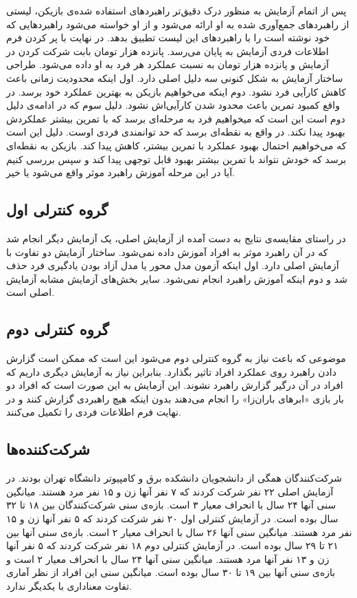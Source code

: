 \documentclass[twoside, a4paper,11pt]{book}
\numberwithin{equation}{chapter}
\numberwithin{table}{chapter}
\numberwithin{figure}{chapter}
\numberwithin{equation}{chapter}
\begin{document}
پس از اتمام آزمایش به منظور درک دقیق‌تر راهبردهای استفاده شده‌ی بازیکن، لیستی از راهبردهای جمع‌آوری شده به او ارائه می‌شود و از او خواسته می‌شود راهبردهایی که خود نوشته است را با راهبردهای این لیست تطبیق بدهد. در نهایت با پر کردن فرم اطلاعات فردی آزمایش به پایان می‌رسد. پانزده هزار تومان بابت شرکت کردن در آزمایش و پانزده هزار تومان به نسبت عملکرد هر فرد به او داده می‌شود.
طراحی ساختار آزمایش به شکل کنونی سه دلیل اصلی دارد. اول اینکه محدودیت زمانی باعث کاهش کارآیی فرد نشود. دوم اینکه می‌خواهیم بازیکن به بهترین عملکرد خود برسد. در واقع کمبود تمرین باعث محدود شدن کارآیی‌اش نشود. دلیل سوم که در ادامه‌ی دلیل دوم است این است که میخواهیم فرد به مرحله‌ای برسد که با تمرین بیشتر عملکردش بهبود پیدا نکند. در واقع به نقطه‌ای برسد که حد توانمندی فردی اوست. دلیل این است که می‌خواهیم احتمال بهبود عملکرد با تمرین بیشتر، کاهش پیدا کند. بازیکن به نقطه‌ای برسد که خودش نتواند با تمرین بیشتر بهبود قابل توجهی پیدا کند و سپس بررسی کنیم آیا در این مرحله آموزش راهبرد موثر واقع می‌شود یا خیر.

\subsection{گروه کنترلی اول}

در راستای مقایسه‌ی نتایج به دست آمده از آزمایش اصلی، یک آزمایش دیگر انجام شد که در آن راهبرد موثر به افراد آموزش داده نمی‌شود. ساختار آزمایش دو تفاوت با آزمایش اصلی دارد. اول اینکه آزمون مدل محور یا مدل آزاد بودن یادگیری فرد حذف شد و دوم اینکه آموزش راهبرد انجام نمی‌شود. سایر بخش‌های آزمایش مشابه آزمایش اصلی است.

\subsection{گروه کنترلی دوم}

موضوعی که باعث نیاز به گروه کنترلی دوم می‌شود این است که ممکن است گزارش دادن راهبرد روی عملکرد افراد تاثیر بگذارد. بنابراین نیاز به آزمایش دیگری داریم که افراد در آن درگیر گزارش راهبرد نشوند. این آزمایش به این صورت است که افراد دو بار بازی «ابرهای باران‌زا» را انجام می‌دهند بدون اینکه هیچ راهبردی گزارش کنند و در نهایت فرم اطلاعات فردی را تکمیل می‌کنند.

\subsection{شرکت‌کننده‌ها}
شرکت‌کنندگان همگی از دانشجویان دانشکده برق و کامپیوتر دانشگاه تهران بودند. در آزمایش اصلی ۲۲ نفر شرکت کردند که ۷ نفر آنها زن و ۱۵ نفر مرد هستند. میانگین سنی آنها ۲۴ سال با انحراف معیار ۳ است. بازه‌ی سنی شرکت‌کنندگان بین ۱۸ تا ۳۲ سال بوده است. در آزمایش کنترلی اول ۲۰ نفر شرکت کردند که ۵ نفر آنها زن و ۱۵ نفر مرد هستند. میانگین سنی آنها ۲۶ سال با انحراف معیار ۲ است. بازه‌ی سنی آنها بین ۲۱ تا ۲۹ سال بوده است. در آزمایش کنترلی دوم ۱۸ نفر شرکت کردند که ۵ نفر آنها زن و ۱۳ نفر آنها مرد هستند. میانگین سنی آنها ۲۴ سال با انحراف معیار ۲ است و بازه‌ی سنی آنها بین ۱۹ تا ۳۰ سال بوده است. میانگین سنی این افراد از نظر آماری تفاوت معناداری با یکدیگر ندارد.
\end{document}
